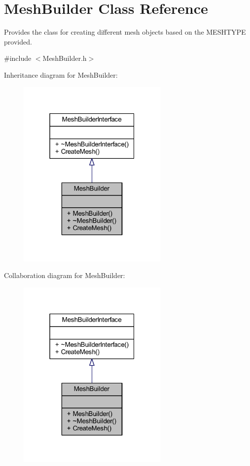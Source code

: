 \hypertarget{class_mesh_builder}{}\section{Mesh\+Builder Class Reference}
\label{class_mesh_builder}


Provides the class for creating different mesh objects based on the M\+E\+S\+H\+T\+Y\+PE provided.  




{\ttfamily \#include $<$Mesh\+Builder.\+h$>$}



Inheritance diagram for Mesh\+Builder\+:
\nopagebreak
\begin{figure}[H]
\begin{center}
\leavevmode
\includegraphics[width=208pt]{class_mesh_builder__inherit__graph}
\end{center}
\end{figure}


Collaboration diagram for Mesh\+Builder\+:
\nopagebreak
\begin{figure}[H]
\begin{center}
\leavevmode
\includegraphics[width=208pt]{class_mesh_builder__coll__graph}
\end{center}
\end{figure}
